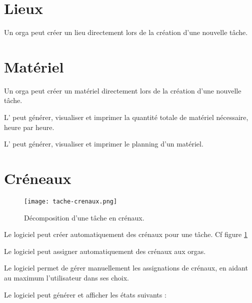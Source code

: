 \section{Lieux}
Un orga peut créer un lieu directement lors de la création d'une nouvelle tâche.

\section{Matériel}

Un orga peut créer un matériel directement lors de la création d'une nouvelle tâche.

L'\oh{} peut générer, visualiser et imprimer la quantité totale de matériel nécessaire, heure par heure.

L'\oh{} peut générer, visualiser et imprimer le planning d'un matériel.

\section{Créneaux}

\begin{figure}[h!t]
\centering
\texttt{[image: tache-crenaux.png]}

\caption{Décomposition d'une tâche en crénaux.}
\label{fig:crenaux}
\end{figure}



Le logiciel peut créer automatiquement des crénaux pour une tâche. Cf figure \ref{fig:crenaux}

Le logiciel peut assigner automatiquement des crénaux aux orgas.

Le logiciel permet de gérer manuellement les assignations de crénaux, en aidant au maximum l'utilisateur dans ses choix.

Le logiciel peut générer et afficher les états suivants : 

